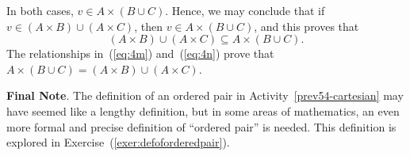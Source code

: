 \begin{myproof}
In both cases, $v \in A \times \left( {B \cup C} \right)$.  Hence, we may conclude that if \linebreak 
$v \in \left( {A \times B} \right) \cup \left( {A \times C} \right)$, then $v \in A \times \left( {B \cup C} \right)$, and this proves that
\begin{equation}  \label{eq:4n}
\left( {A \times B} \right) \cup \left( {A \times C} \right) \subseteq A \times \left( {B \cup C} \right)\!.
\end{equation}
The relationships in~(\ref{eq:4m}) and~(\ref{eq:4n}) prove that $A \times \left( {B \cup C} \right) = \left( {A \times B} \right) \cup \left( {A \times C} \right)$.
\end{myproof}

\noindent
\textbf{Final Note}.  The definition of an ordered pair in \typeu Activity~\ref*{prev54-cartesian} may have seemed like a lengthy definition, but in some areas of mathematics, an even more formal and precise definition of ``ordered pair'' is needed.  This definition is explored in  
Exercise~(\ref{exer:defoforderedpair}).
\hbreak


\endinput
